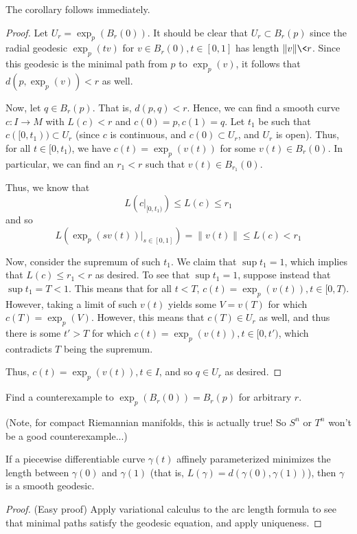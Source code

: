 \documentclass[../main.tex]{subfiles}
\begin{document}
The corollary follows immediately.

\begin{proof}
    Let $U_r = \exp_p(B_r(0))$. It should be clear that $U_r\subset B_r(p)$
    since the radial geodesic $\exp_p(tv)$ for $v\in B_r(0), t\in[0,1]$ has
    length $\|v\| \<r$. Since this geodesic is the minimal path from $p$ to
    $\exp_p(v)$, it follows that $d(p,\exp_p(v))<r$ as well.

    Now, let $q\in B_r(p)$. That is, $d(p,q)<r$. Hence, we can find a smooth
    curve $c:I\to M$ with $L(c)<r$ and $c(0)=p,c(1)=q$.
    Let $t_1$ be such that $c([0,t_1))\subset U_r$ (since $c$ is continuous, and
    $c(0)\subset U_r$, and $U_r$ is open).
    Thus, for all $t\in[0,t_1)$, we have $c(t) = \exp_p(v(t))$ for some $v(t)\in
    B_r(0)$. In particular, we can find an $r_1<r$ such that $v(t)\in
    B_{r_1}(0)$. 

    Thus, we know that
    \[
        L(c|_{[0,t_1)})\leq L(c)\leq r_1
    \]
    and so
    \[
        L(\exp_p(sv(t))|_{s\in[0,1]})=\|v(t)\|\leq L(c) <r_1
    \]

    Now, consider the supremum of such $t_1$. We claim that $\sup t_1 = 1$,
    which implies that $L(c)\leq r_1<r$ as desired. To see that $\sup t_1 = 1$,
    suppose instead that $\sup t_1 = T < 1$. This means that for all $t<T$,
    $c(t) = \exp_p(v(t)), t\in[0,T)$. However, taking a limit of such $v(t)$
    yields some $V = v(T)$ for which $c(T) = \exp_p(V)$. However, this means
    that $c(T)\in U_r$ as well, and thus there is some $t' > T$ for which $c(t)
    = \exp_p(v(t)),t\in[0,t')$, which contradicts $T$ being the supremum.

    Thus, $c(t) = \exp_p(v(t)),t\in I$, and so $q\in U_r$ as desired.
\end{proof}

\begin{hw}
    Find a counterexample to $\exp_p(B_r(0)) = B_r(p)$ for arbitrary $r$.
\end{hw}
(Note, for compact Riemannian manifolds, this is actually true! So $S^n$ or
$T^n$ won't be a good counterexample...)


\begin{cor}
    If a piecewise differentiable curve $\gamma(t)$ affinely parameterized
    minimizes the length between $\gamma(0)$ and $\gamma(1)$ (that is,
    $L(\gamma) = d(\gamma(0),\gamma(1))$), then $\gamma$ is a smooth geodesic.
\end{cor}

\begin{proof}
    (Easy proof) Apply variational calculus to the arc length formula to see
    that minimal paths satisfy the geodesic equation, and apply uniqueness.
\end{proof}
\end{document}

